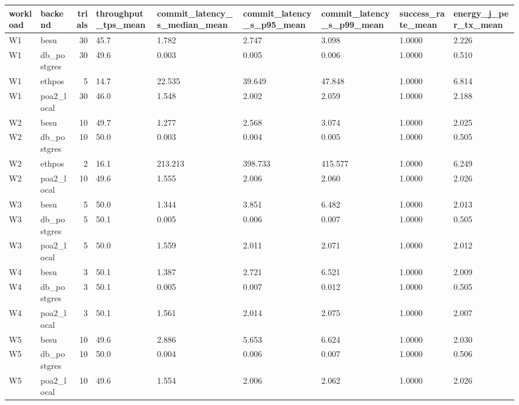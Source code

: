 \begin{tabular}{llrllllll}
\toprule
workload & backend & trials & throughput\_tps\_mean & commit\_latency\_s\_median\_mean & commit\_latency\_s\_p95\_mean & commit\_latency\_s\_p99\_mean & success\_rate\_mean & energy\_j\_per\_tx\_mean \\
\midrule
W1 & besu & 30 & 45.7 & 1.782 & 2.747 & 3.098 & 1.0000 & 2.226 \\
W1 & db\_postgres & 30 & 49.6 & 0.003 & 0.005 & 0.006 & 1.0000 & 0.510 \\
W1 & ethpos & 5 & 14.7 & 22.535 & 39.649 & 47.848 & 1.0000 & 6.814 \\
W1 & poa2\_local & 30 & 46.0 & 1.548 & 2.002 & 2.059 & 1.0000 & 2.188 \\
W2 & besu & 10 & 49.7 & 1.277 & 2.568 & 3.074 & 1.0000 & 2.025 \\
W2 & db\_postgres & 10 & 50.0 & 0.003 & 0.004 & 0.005 & 1.0000 & 0.505 \\
W2 & ethpos & 2 & 16.1 & 213.213 & 398.733 & 415.577 & 1.0000 & 6.249 \\
W2 & poa2\_local & 10 & 49.6 & 1.555 & 2.006 & 2.060 & 1.0000 & 2.026 \\
W3 & besu & 5 & 50.0 & 1.344 & 3.851 & 6.482 & 1.0000 & 2.013 \\
W3 & db\_postgres & 5 & 50.1 & 0.005 & 0.006 & 0.007 & 1.0000 & 0.505 \\
W3 & poa2\_local & 5 & 50.0 & 1.559 & 2.011 & 2.071 & 1.0000 & 2.012 \\
W4 & besu & 3 & 50.1 & 1.387 & 2.721 & 6.521 & 1.0000 & 2.009 \\
W4 & db\_postgres & 3 & 50.1 & 0.005 & 0.007 & 0.012 & 1.0000 & 0.505 \\
W4 & poa2\_local & 3 & 50.1 & 1.561 & 2.014 & 2.075 & 1.0000 & 2.007 \\
W5 & besu & 10 & 49.6 & 2.886 & 5.653 & 6.624 & 1.0000 & 2.030 \\
W5 & db\_postgres & 10 & 50.0 & 0.004 & 0.006 & 0.007 & 1.0000 & 0.506 \\
W5 & poa2\_local & 10 & 49.6 & 1.554 & 2.006 & 2.062 & 1.0000 & 2.026 \\
\bottomrule
\end{tabular}
